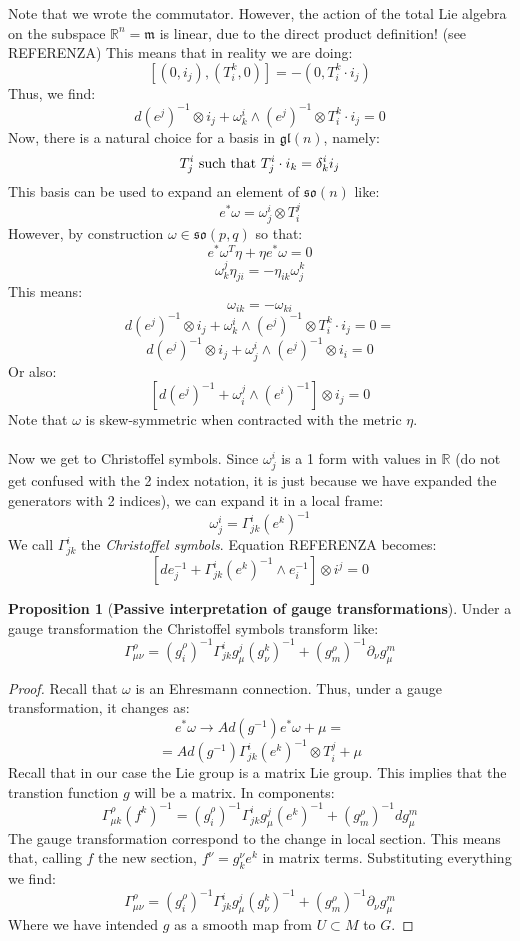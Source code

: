 \documentclass[12pt,a4paper]{report}
\theoremstyle{definition}
\theoremstyle{Theorem}
\newtheorem{Prop}[Def]{Proposition}
\theoremstyle{definition}
\theoremstyle{definition}
\begin{document}
		Note that we wrote the commutator. However, the action of the total Lie algebra on the subspace $\mathbb{R}^n=\mathfrak{m}$ is linear, due to the direct product definition! (see REFERENZA) This means that in reality we are doing:
		$$[(0,i_j),(T^k_i,0)]=-(0,T_i^k\cdot i_j)$$
		Thus, we find:
		$$d(e^j)^{-1}\otimes i_j+ \omega^i_k\wedge (e^j)^{-1} \otimes T_i^k\cdot i_j=0$$
		Now, there is a natural choice for a basis in $\mathfrak{gl}(n)$, namely:
		$$T^i_j\hbox{ such that }T^i_j\cdot i_k=\delta_k^i i_j$$
		This basis can be used to expand an element of $\mathfrak{so}(n)$ like:
		$$e^*\omega=\omega^i_j\otimes T^j_i$$
		However, by construction $\omega\in\mathfrak{so}(p,q)$ so that:
		$$e^*\omega^T\eta+\eta e^*\omega=0$$
		$$\omega^j_k\eta_{ji}=-\eta_{ik}\omega^k_j$$ 
		This means:
		$$\omega_{ik}=-\omega_{ki}$$
		$$d(e^j)^{-1}\otimes i_j+ \omega^i_k\wedge (e^j)^{-1} \otimes T_i^k\cdot i_j=0=$$
		$$d(e^j)^{-1}\otimes i_j+ \omega^i_j\wedge (e^j)^{-1} \otimes i_i=0$$
		Or also:
		$$[d(e^j)^{-1}+ \omega_i^j\wedge (e^i)^{-1} ]\otimes i_j=0$$
		Note that $\omega$ is skew-symmetric when contracted with the metric $\eta$.\\
		\\
		Now we get to Christoffel symbols. Since $\omega^i_j$ is a 1 form with values in $\mathbb{R}$ (do not get confused with the 2 index notation, it is just because we have expanded the generators with 2 indices), we can expand it in a local frame:
		$$\omega^i_j=\Gamma^i_{jk}(e^k)^{-1}$$
		We call $\Gamma^i_{jk}$ the \textit{Christoffel symbols}. Equation REFERENZA becomes:
		$$[de_j^{-1}+ \Gamma^i_{jk}(e^k)^{-1}\wedge e_i^{-1}]\otimes i^j=0$$
		\begin{Prop} [\textbf{Passive interpretation of gauge transformations}]
			Under a gauge transformation the Christoffel symbols transform like:
			$$\Gamma^\rho_{\mu\nu}=(g^\rho_i)^{-1}\Gamma^i_{jk}g^j_\mu (g^k_\nu)^{-1}+(g_m^\rho)^{-1}\partial_\nu g^m_{\mu}$$
		\end{Prop}
		\begin{proof}
			Recall that $\omega$ is an Ehresmann connection. Thus, under a gauge transformation, it changes as:
			$$e^*\omega\rightarrow Ad(g^{-1})e^*\omega+\mu=$$
			$$=Ad(g^{-1})\Gamma^i_{jk}(e^k)^{-1}\otimes T^j_i+\mu$$
			Recall that in our case the Lie group is a matrix Lie group. This implies that the transtion function $g$ will be a matrix. In components:
			$$\Gamma^\rho_{\mu k}(f^k)^{-1}=(g^\rho_i)^{-1}\Gamma^i_{jk}g^j_\mu (e^k)^{-1}+(g_m^\rho)^{-1}dg^m_{\mu}$$
			The gauge transformation correspond to the change in local section. This means that, calling $f$ the new section, $f^\nu=g^\nu_ke^k$ in matrix terms. Substituting everything we find:
			$$\Gamma^\rho_{\mu\nu}=(g^\rho_i)^{-1}\Gamma^i_{jk}g^j_\mu (g^k_\nu)^{-1}+(g_m^\rho)^{-1}\partial_\nu g^m_{\mu}$$
			Where we have intended $g$ as a smooth map from $U\subset M$ to $G$.
		\end{proof}
\end{document}
